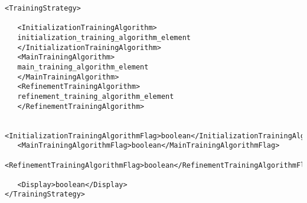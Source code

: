 \begin{lstlisting}
<TrainingStrategy>

   <InitializationTrainingAlgorithm>
   initialization_training_algorithm_element
   </InitializationTrainingAlgorithm>
   <MainTrainingAlgorithm>
   main_training_algorithm_element
   </MainTrainingAlgorithm>
   <RefinementTrainingAlgorithm>
   refinement_training_algorithm_element
   </RefinementTrainingAlgorithm>

   <InitializationTrainingAlgorithmFlag>boolean</InitializationTrainingAlgorithmFlag>
   <MainTrainingAlgorithmFlag>boolean</MainTrainingAlgorithmFlag>
   <RefinementTrainingAlgorithmFlag>boolean</RefinementTrainingAlgorithmFlag>
       
   <Display>boolean</Display>
</TrainingStrategy>
\end{lstlisting}

